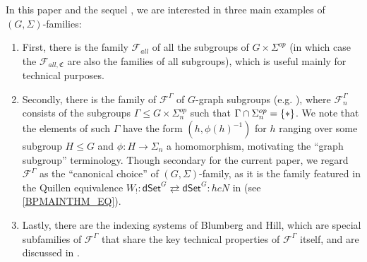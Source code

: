\documentclass[a4paper,10pt
 ,final
]{article}%
\numberwithin{equation}{section}
\numberwithin{figure}{section}
\theoremstyle{definition} %
\newcommand{\F}{\ensuremath{\mathcal F}}
\newcommand{\1}{\ensuremath{\mathbbm 1}}%
\begin{document}
In this paper and the sequel \cite{BP_TAS}, 
we are interested in three main examples of $(G,\Sigma)$-families:

\begin{enumerate}[label = (\alph*)]
\item First, there is the family $\F_{all}$ of all the subgroups of $G \times \Sigma^{op}$
      (in which case the $\F_{all,\mathfrak{C}}$ are also the families of all subgroups), which is useful mainly for technical purposes.
      
\item Secondly, there is the family of $\F^{\Gamma}$
      of $G$-graph subgroups (e.g. \cite[Def. 6.36]{BP_geo}),
      where $\F^{\Gamma}_n$ consists of the subgroups
      $\Gamma \leq G \times \Sigma_n^{op}$
      such that $\Gamma \cap \Sigma_n^{op} = \{\**\}$.
      We note that the elements of such $\Gamma$
      have the form $(h,\phi(h)^{-1})$
      for $h$ ranging over some subgroup $H \leq G$
      and $\phi \colon H \to \Sigma_n$
      a homomorphism,
      motivating the ``graph subgroup'' terminology.
%
      Though secondary for the current paper, 
      we regard $\F^{\Gamma}$ as the ``canonical choice'' of
      $(G,\Sigma)$-family, 
      as it is the family featured in the Quillen equivalence
      $W_! \colon 
      \mathsf{dSet}^G \rightleftarrows 
      \mathsf{dSet}^G \colon hcN$
      in \cite[Thm. I]{BP_TAS} 
      (see \eqref{BPMAINTHM_EQ}).
      
\item Lastly, there are the indexing systems of Blumberg and Hill,
      which are special subfamilies of $\F^{\Gamma}$
      that share the key technical properties of 
      $\F^{\Gamma}$ itself,
      and are discussed in 
      \cite[\S \ref{OC-INDSYS_SEC}]{BP_FCOP}.
\end{enumerate}
\end{document}
